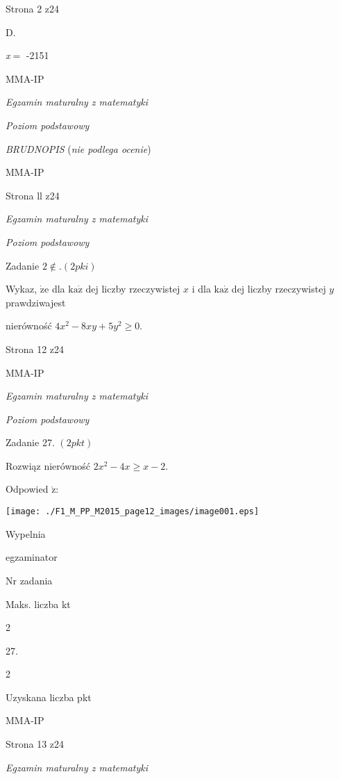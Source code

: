 \documentclass[a4paper,12pt]{article}
\begin{document}
Strona 2 z24

D.

{\it x}$=$ -2151

MMA-IP





{\it Egzamin maturalny z matematyki}

{\it Poziom podstawowy}

{\it BRUDNOPIS} ({\it nie podlega ocenie})

MMA-IP

Strona ll z24





{\it Egzamin maturalny z matematyki}

{\it Poziom podstawowy}

Zadanie $2\not\in. (2pki)$

Wykaz, $\dot{\mathrm{z}}\mathrm{e}$ dla $\mathrm{k}\mathrm{a}\dot{\mathrm{z}}$ dej liczby rzeczywistej $x$ i dla $\mathrm{k}\mathrm{a}\dot{\mathrm{z}}$ dej liczby rzeczywistej $y$ prawdziwajest

nierówność $4x^{2}-8xy+5y^{2}\geq 0.$

Strona 12 z24

MMA-IP





{\it Egzamin maturalny z matematyki}

{\it Poziom podstawowy}

Zadanie 27. $(2pkt)$

Rozwiąz nierówność $2x^{2}-4x\geq x-2.$

Odpowied $\acute{\mathrm{z}}$:
\begin{center}
\texttt{[image: ./F1\_M\_PP\_M2015\_page12\_images/image001.eps]}
\end{center}
Wypelnia

egzaminator

Nr zadania

Maks. liczba kt

2

27.

2

Uzyskana liczba pkt

MMA-IP

Strona 13 z24





{\it Egzamin maturalny z matematyki}
\end{document}
